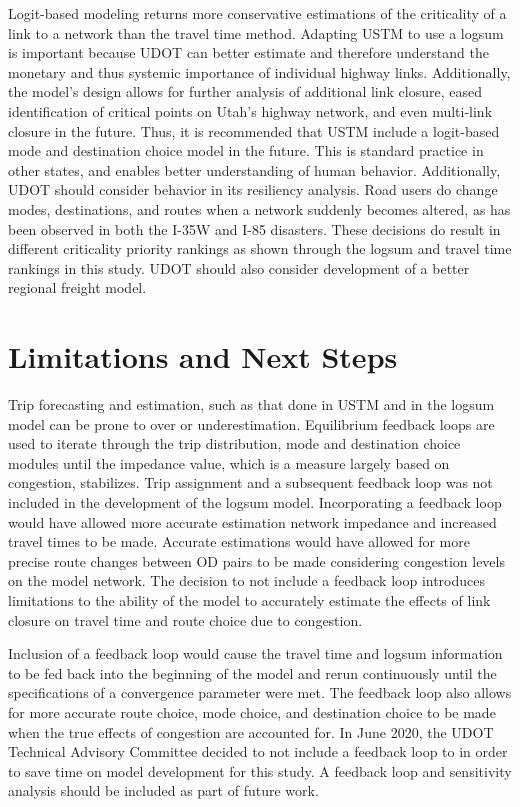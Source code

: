 Logit-based modeling returns more conservative
estimations of the criticality of a link to a network than the travel time method.
Adapting USTM to use a logsum is important because UDOT can better estimate and therefore understand
the monetary and thus systemic importance of individual highway links.
Additionally, the model’s design allows for further
analysis of additional link closure, eased identification of critical
points on Utah's highway network, and even multi-link closure in the
future. Thus, it is recommended that USTM include a logit-based mode and destination
choice model in the future. This is standard practice in other states, and enables better understanding of
human behavior. Additionally, UDOT should consider behavior in its resiliency
analysis. Road users do change modes, destinations, and routes when a network
suddenly becomes altered, as has been observed in both the I-35W and I-85 disasters.
These decisions do result in different criticality
priority rankings as shown through the logsum and travel time rankings in this study.
UDOT should also consider development of a better regional freight model.

\section{Limitations and Next Steps}

Trip forecasting and estimation, such as that done in USTM and in the logsum model
can be prone to over or underestimation. Equilibrium feedback loops are used to
iterate through the trip distribution, mode and destination choice modules until the
impedance value, which is a measure largely based on congestion, stabilizes.
Trip assignment and a subsequent feedback loop was not included in the development
of the logsum model. Incorporating a
feedback loop would have allowed more accurate estimation network impedance and increased
travel times to be made. Accurate estimations would have allowed for more precise
route changes between OD pairs to be made considering congestion levels on the model
network. The decision to not include a feedback loop introduces limitations to the
ability of the model to accurately estimate the effects of link closure on
travel time and route choice due to congestion.

Inclusion of a feedback loop would cause the
travel time and logsum information to be fed back into the beginning of the
model and rerun continuously until the specifications of a convergence
parameter were met. The feedback loop
also allows for more accurate route choice, mode choice, and destination
choice to be made when the true effects of congestion are accounted for.
In June 2020, the UDOT Technical Advisory Committee decided to not include a
feedback loop to in order to save time
on model development for this study. A feedback loop and sensitivity analysis
should be included as part of future work.

